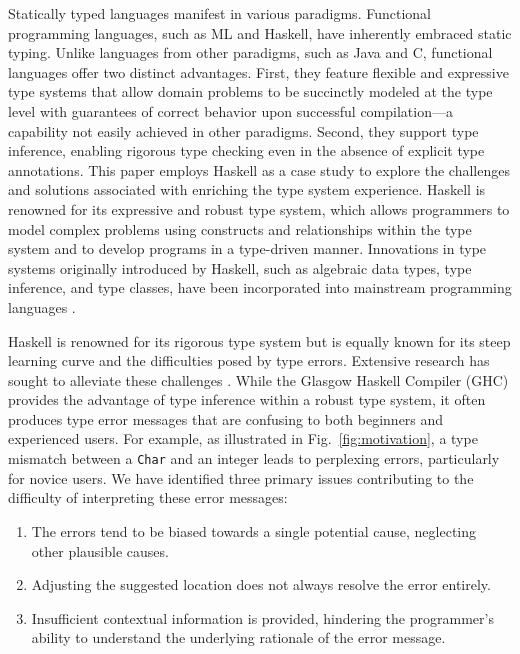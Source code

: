 \documentclass[pdflatex,sn-mathphys-num]{sn-jnl}%
\begin{document}
Statically typed languages manifest in various paradigms. Functional programming languages, such as ML and Haskell, have inherently embraced static typing. Unlike languages from other paradigms, such as Java and C, functional languages offer two distinct advantages. First, they feature flexible and expressive type systems that allow domain problems to be succinctly modeled at the type level with guarantees of correct behavior upon successful compilation—a capability not easily achieved in other paradigms. Second, they support type inference, enabling rigorous type checking even in the absence of explicit type annotations. This paper employs Haskell as a case study to explore the challenges and solutions associated with enriching the type system experience. Haskell is renowned for its expressive and robust type system, which allows programmers to model complex problems using constructs and relationships within the type system and to develop programs in a type-driven manner. Innovations in type systems originally introduced by Haskell, such as algebraic data types, type inference, and type classes, have been incorporated into mainstream programming languages \cite{Hudak2007-kn, TypeScriptTeam_undated-qk, Klabnik_undated-mp, Griesemer_undated-ff}.

    
Haskell is renowned for its rigorous type system but is equally known for its steep learning curve and the difficulties posed by type errors. Extensive research has sought to alleviate these challenges \cite{Tirronen2015-nr, Chen2014-dz, Heeren2003-kd, Zhang2015-xy, Lerner2007-mu, Zhang2017-tj}. While the Glasgow Haskell Compiler (GHC) provides the advantage of type inference within a robust type system, it often produces type error messages that are confusing to both beginners and experienced users. For example, as illustrated in Fig.~\ref{fig:motivation}, a type mismatch between a {\tt Char} and an integer leads to perplexing errors, particularly for novice users. We have identified three primary issues contributing to the difficulty of interpreting these error messages:

\begin{enumerate}
    \item The errors tend to be biased towards a single potential cause, neglecting other plausible causes.
    \item Adjusting the suggested location does not always resolve the error entirely.
    \item Insufficient contextual information is provided, hindering the programmer's ability to understand the underlying rationale of the error message.
\end{enumerate}
\end{document}
